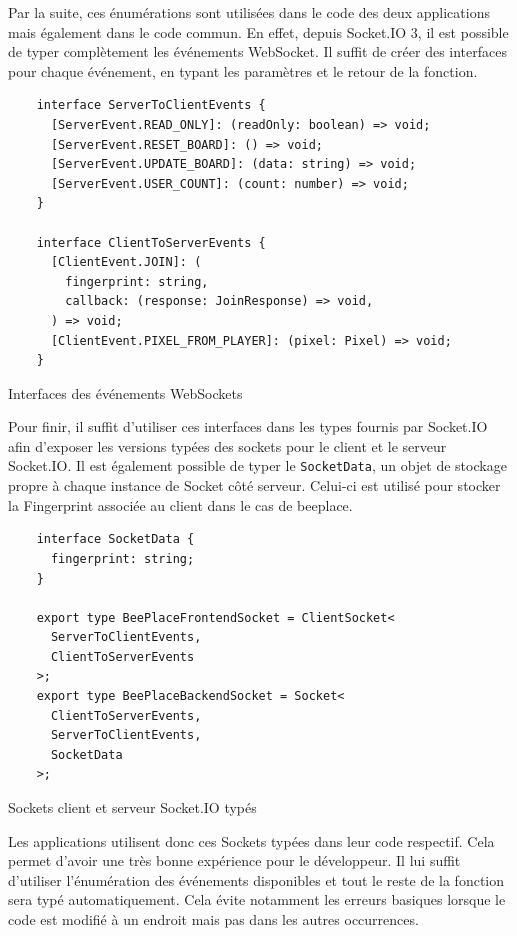 Par la suite, ces énumérations sont utilisées dans le code des deux applications mais également dans le code commun. En effet, depuis Socket.IO 3, il est possible de typer complètement les événements WebSocket. Il suffit de créer des interfaces pour chaque événement, en typant les paramètres et le retour de la fonction.

\begin{listing}[H]
  \begin{verbatim}
    interface ServerToClientEvents {
      [ServerEvent.READ_ONLY]: (readOnly: boolean) => void;
      [ServerEvent.RESET_BOARD]: () => void;
      [ServerEvent.UPDATE_BOARD]: (data: string) => void;
      [ServerEvent.USER_COUNT]: (count: number) => void;
    }

    interface ClientToServerEvents {
      [ClientEvent.JOIN]: (
        fingerprint: string,
        callback: (response: JoinResponse) => void,
      ) => void;
      [ClientEvent.PIXEL_FROM_PLAYER]: (pixel: Pixel) => void;
    }
\end{verbatim}
  \caption{Interfaces des événements WebSockets}
  \label{listing:websockets-events-interfaces}
\end{listing}

Pour finir, il suffit d'utiliser ces interfaces dans les types fournis par Socket.IO afin d'exposer les versions typées des sockets pour le client et le serveur Socket.IO. Il est également possible de typer le \texttt{SocketData}, un objet de stockage propre à chaque instance de Socket côté serveur. Celui-ci est utilisé pour stocker la Fingerprint associée au client dans le cas de \gls{beeplace}.

\begin{listing}[H]
  \begin{verbatim}
    interface SocketData {
      fingerprint: string;
    }

    export type BeePlaceFrontendSocket = ClientSocket<
      ServerToClientEvents,
      ClientToServerEvents
    >;
    export type BeePlaceBackendSocket = Socket<
      ClientToServerEvents,
      ServerToClientEvents,
      SocketData
    >;
\end{verbatim}
  \caption{Sockets client et serveur Socket.IO typés}
  \label{listing:typed-socket-io}
\end{listing}

Les applications utilisent donc ces Sockets typées dans leur code respectif. Cela permet d'avoir une très bonne expérience pour le développeur. Il lui suffit d'utiliser l'énumération des événements disponibles et tout le reste de la fonction sera typé automatiquement. Cela évite notamment les erreurs basiques lorsque le code est modifié à un endroit mais pas dans les autres occurrences.
